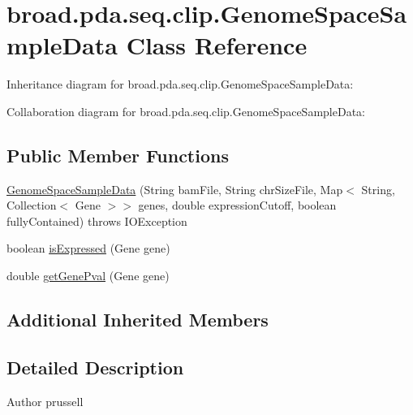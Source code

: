 \hypertarget{classbroad_1_1pda_1_1seq_1_1clip_1_1_genome_space_sample_data}{\section{broad.\+pda.\+seq.\+clip.\+Genome\+Space\+Sample\+Data Class Reference}
\label{classbroad_1_1pda_1_1seq_1_1clip_1_1_genome_space_sample_data}
}


Inheritance diagram for broad.\+pda.\+seq.\+clip.\+Genome\+Space\+Sample\+Data\+:


Collaboration diagram for broad.\+pda.\+seq.\+clip.\+Genome\+Space\+Sample\+Data\+:
\subsection*{Public Member Functions}
\begin{DoxyCompactItemize}
\item 
\hyperlink{classbroad_1_1pda_1_1seq_1_1clip_1_1_genome_space_sample_data_adc0e201ce593f6d21b1f7b32c907f6a5}{Genome\+Space\+Sample\+Data} (String bam\+File, String chr\+Size\+File, Map$<$ String, Collection$<$ Gene $>$$>$ genes, double expression\+Cutoff, boolean fully\+Contained)  throws I\+O\+Exception 
\item 
boolean \hyperlink{classbroad_1_1pda_1_1seq_1_1clip_1_1_genome_space_sample_data_afe48c74821821d5bdc1feb0dce339646}{is\+Expressed} (Gene gene)
\item 
double \hyperlink{classbroad_1_1pda_1_1seq_1_1clip_1_1_genome_space_sample_data_ad0f782f3334827febea9c93e01878ae6}{get\+Gene\+Pval} (Gene gene)
\end{DoxyCompactItemize}
\subsection*{Additional Inherited Members}


\subsection{Detailed Description}
\begin{DoxyAuthor}{Author}
prussell 
\end{DoxyAuthor}


